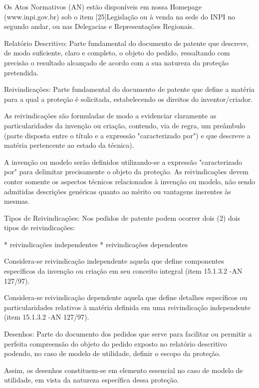 \documentclass[12pt]{article}
\begin{document}
    Os Atos Normativos (AN) estão disponíveis em nossa Homepage
    (www.inpi.gov.br) sob o item [25]Legislação ou à venda na sede do
    INPI no segundo andar, ou nas Delegacias e Representações
    Regionais.
    
    Relatório Descritivo: Parte fundamental do documento de patente
    que descreve, de modo suficiente, claro e completo, o objeto do
    pedido, ressaltando com precisão o resultado alcançado de acordo
    com a sua natureza da proteção pretendida.
    
    Reivindicações: Parte fundamental do documento de patente que
    define a matéria para a qual a proteção é solicitada,
    estabelecendo os direitos do inventor/criador.
    
    As reivindicações são formuladas de modo a evidenciar claramente
    as particularidades da invenção ou criação, contendo, via de
    regra, um preâmbulo (parte disposta entre o título e a expressão
    "caracterizado por") e que descreve a matéria pertencente ao
    estado da técnica).
    
    A invenção ou modelo serão definidos utilizando-se a expressão
    "caracterizado por" para delimitar precisamente o objeto da
    proteção. As reivindicações devem conter somente os aspectos
    técnicos relacionados à invenção ou modelo, não sendo admitidas
    descrições genéricas quanto ao mérito ou vantagens inerentes às
    mesmas.
    
    Tipos de Reivindicações: Nos pedidos de patente podem ocorrer dois
    (2) dois tipos de reivindicações:

     * reivindicações independentes 
     * reivindicações dependentes
     
     Considera-se reivindicação independente aquela que define
     componentes específicos da invenção ou criação em seu conceito
     integral (item 15.1.3.2 -AN 127/97).
     
     Considera-se reivindicação dependente aquela que define detalhes
     específicos ou particularidades relativos à matéria definida em
     uma reivindicação independente (item 15.1.3.2 -AN 127/97).
     
     Desenhos: Parte do documento dos pedidos que serve para facilitar
     ou permitir a perfeita compreensão do objeto do pedido exposto no
     relatório descritivo podendo, no caso de modelo de utilidade,
     definir o escopo da proteção.
     
     Assim, os desenhos constituem-se em elemento essencial no caso de
     modelo de utilidade, em vista da natureza específica dessa
     proteção.
     
\end{document}

